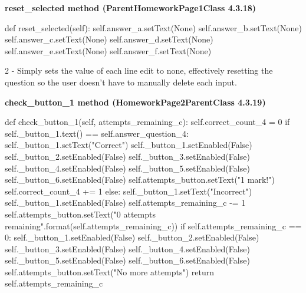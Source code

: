 \textbf{reset\_selected method (ParentHomeworkPage1Class 4.3.18)}

\begin{python}
def reset_selected(self):
        self.answer_a.setText(None)
        self.answer_b.setText(None)
        self.answer_c.setText(None)
        self.answer_d.setText(None)
        self.answer_e.setText(None)
        self.answer_f.setText(None)
\end{python}

2 - Simply sets the value of each line edit to none, effectively resetting the question so the user doesn't have to manually delete each input.

\textbf{check\_button\_1 method (HomeworkPage2ParentClass 4.3.19)}

\begin{python}
def check_button_1(self, attempts_remaining_c):
        self.correct_count_4 = 0
        if self._button_1.text() == self.answer_question_4:
            self._button_1.setText("Correct")
            self._button_1.setEnabled(False)
            self._button_2.setEnabled(False)
            self._button_3.setEnabled(False)
            self._button_4.setEnabled(False)
            self._button_5.setEnabled(False)
            self._button_6.setEnabled(False)
            self.attempts_button.setText("1 mark!")
            self.correct_count_4 += 1
        else:
            self._button_1.setText("Incorrect")
            self._button_1.setEnabled(False)
            self.attempts_remaining_c -= 1
            self.attempts_button.setText("{0} attempts remaining".format(self.attempts_remaining_c))
            if self.attempts_remaining_c == 0:
                self._button_1.setEnabled(False)
                self._button_2.setEnabled(False)
                self._button_3.setEnabled(False)
                self._button_4.setEnabled(False)
                self._button_5.setEnabled(False)
                self._button_6.setEnabled(False)
                self.attempts_button.setText("No more attempts")
            return self.attempts_remaining_c
\end{python}

